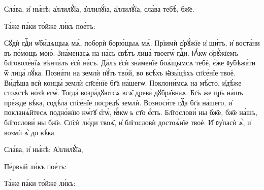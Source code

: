 \hKv Сла́ва, и҆ ны́нѣ: 
а҆ллилꙋ́їа, а҆ллилꙋ́їа, а҆ллилꙋ́їа, сла́ва тебѣ̀, бж҃е.  



%
Та́же па́ки то́йже ли́къ пое́тъ:  

\cuLettrine
Сꙋдѝ гдⷭ҇и ѡ҆би́дѧщыѧ мѧ̀, поборѝ борю́щыѧ мѧ̀. 
\hKv Прїимѝ ѻ҆рꙋ́жїе и҆ щи́тъ, и҆ воста́ни въ по́мощь мою̀.  
\hKv Зна́менасѧ на на́съ свѣ́тъ лица̀ твоегѡ̀ гдⷭ҇и. 
\hKv  Ꙗ҆́кѡ ѻ҆рꙋ́жїемъ бл҃говоле́нїѧ вѣнча́лъ є҆сѝ на́съ.  
\hKv Да́лъ є҆сѝ зна́менїе боѧ́щымсѧ тебѐ, є҆́же  ᲂу҆бѣжа́ти ѿ лица̀ лꙋ́ка. 
\hKv Позна́ти на землѝ пꙋ́ть  тво́й, во всѣ́хъ ꙗ҆зы́цѣхъ сп҃се́нїе твоѐ. 
\hKv Ви́дѣша  всѝ концы̀ землѝ сп҃се́нїе бг҃а на́шегѡ. 
\hKv Поклони́мсѧ  на мѣ́сто, и҆дѣ́же стоѧ́стѣ но́зѣ є҆гѡ̀. 
\hKv Тогда̀  возра́дꙋютсѧ всѧ̑ древа̀ дꙋбра̑внаѧ. 
\hKv Бг҃ъ же цр҃ь на́шъ  пре́жде вѣ́ка, содѣ́ла сп҃се́нїе посредѣ̀ землѝ. 
\hKv  Возноси́те гдⷭ҇а бг҃а на́шего, и҆ покланѧ́йтесѧ подно́жїю  нѡ́гꙋ є҆гѡ̀, ꙗ҆́кѡ ь ст҃о є҆́сть. 
\hKv Бл҃гослови́ ны  бж҃е, бж҃е на́шъ, бл҃гослови́ ны бж҃е. 
\hKv Сп҃сѝ лю́ди  твоѧ̑, и҆ бл҃гословѝ достоѧ́нїе твоѐ. И҆ ᲂу҆пасѝ ѧ҆̀, и҆  возмѝ ѧ҆̀ до вѣ́ка.  

\hKv Сла́ва, и҆ ны́нѣ: А҆ллилꙋ́їа, 

%
%
Пе́рвый ли́къ пое́тъ: 

%
Та́же па́ки то́йже ли́къ: 

